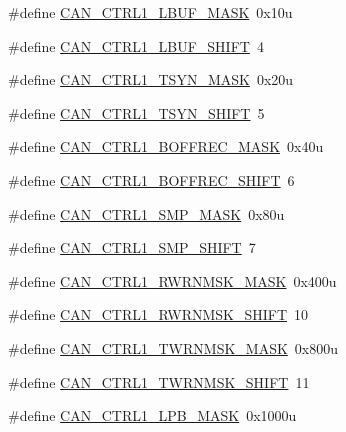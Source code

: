 \begin{DoxyCompactItemize}
\item 
\#define \hyperlink{group___c_a_n___register___masks_ga91b1b6502a9996e9639d28760d00ee88}{C\+A\+N\+\_\+\+C\+T\+R\+L1\+\_\+\+L\+B\+U\+F\+\_\+\+M\+A\+SK}~0x10u
\item 
\#define \hyperlink{group___c_a_n___register___masks_ga1ebb72a42560e1f78bb6f10cfeec8945}{C\+A\+N\+\_\+\+C\+T\+R\+L1\+\_\+\+L\+B\+U\+F\+\_\+\+S\+H\+I\+FT}~4
\item 
\#define \hyperlink{group___c_a_n___register___masks_ga2ceb4b7bca561020b4899dd2087e5260}{C\+A\+N\+\_\+\+C\+T\+R\+L1\+\_\+\+T\+S\+Y\+N\+\_\+\+M\+A\+SK}~0x20u
\item 
\#define \hyperlink{group___c_a_n___register___masks_gaff5bfe8a985c0511b72d2518b0bb1708}{C\+A\+N\+\_\+\+C\+T\+R\+L1\+\_\+\+T\+S\+Y\+N\+\_\+\+S\+H\+I\+FT}~5
\item 
\#define \hyperlink{group___c_a_n___register___masks_ga830ac693c34ebcc732acb2649afd87b2}{C\+A\+N\+\_\+\+C\+T\+R\+L1\+\_\+\+B\+O\+F\+F\+R\+E\+C\+\_\+\+M\+A\+SK}~0x40u
\item 
\#define \hyperlink{group___c_a_n___register___masks_ga0c22289dc934d1dcc577a77f1c7130a4}{C\+A\+N\+\_\+\+C\+T\+R\+L1\+\_\+\+B\+O\+F\+F\+R\+E\+C\+\_\+\+S\+H\+I\+FT}~6
\item 
\#define \hyperlink{group___c_a_n___register___masks_ga3f5256ab5fbe54468bce422ba7ee4fbf}{C\+A\+N\+\_\+\+C\+T\+R\+L1\+\_\+\+S\+M\+P\+\_\+\+M\+A\+SK}~0x80u
\item 
\#define \hyperlink{group___c_a_n___register___masks_ga51311c5bddb44be7525e317cde09d9b4}{C\+A\+N\+\_\+\+C\+T\+R\+L1\+\_\+\+S\+M\+P\+\_\+\+S\+H\+I\+FT}~7
\item 
\#define \hyperlink{group___c_a_n___register___masks_ga5f1140aae7ce80eb8ee0793c3171f841}{C\+A\+N\+\_\+\+C\+T\+R\+L1\+\_\+\+R\+W\+R\+N\+M\+S\+K\+\_\+\+M\+A\+SK}~0x400u
\item 
\#define \hyperlink{group___c_a_n___register___masks_gaaaa2935c6f8490bc19c7514f9a3eea5c}{C\+A\+N\+\_\+\+C\+T\+R\+L1\+\_\+\+R\+W\+R\+N\+M\+S\+K\+\_\+\+S\+H\+I\+FT}~10
\item 
\#define \hyperlink{group___c_a_n___register___masks_ga87f6ef900cc1d1a39b28eb8ac2a47493}{C\+A\+N\+\_\+\+C\+T\+R\+L1\+\_\+\+T\+W\+R\+N\+M\+S\+K\+\_\+\+M\+A\+SK}~0x800u
\item 
\#define \hyperlink{group___c_a_n___register___masks_gaf1bd84bad38306a14085dc57cb8728bf}{C\+A\+N\+\_\+\+C\+T\+R\+L1\+\_\+\+T\+W\+R\+N\+M\+S\+K\+\_\+\+S\+H\+I\+FT}~11
\item 
\#define \hyperlink{group___c_a_n___register___masks_ga6c3587074ec8b0646ec8c99f659bc90b}{C\+A\+N\+\_\+\+C\+T\+R\+L1\+\_\+\+L\+P\+B\+\_\+\+M\+A\+SK}~0x1000u

\end{DoxyCompactItemize}
